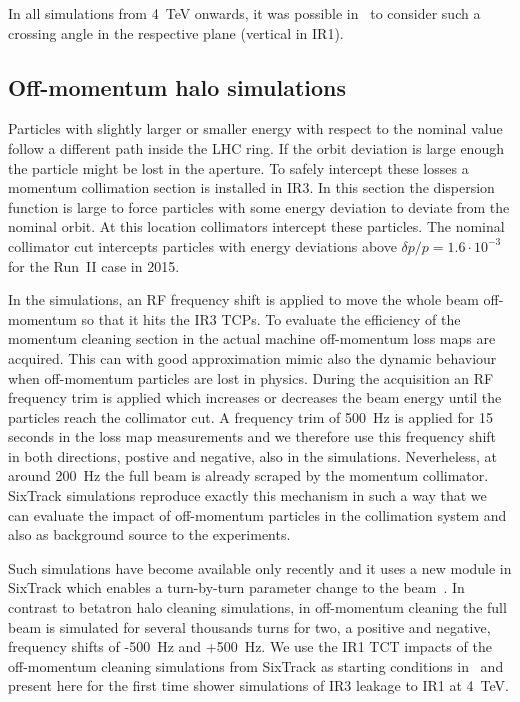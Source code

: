 In all simulations from 4~TeV onwards, it was possible in \fluka~to consider such a crossing angle in the respective plane (vertical in IR1).

\subsection{Off-momentum halo simulations}
Particles with slightly larger or smaller energy with respect to the nominal value follow a different path inside the LHC ring. If the orbit deviation is large enough the particle might be lost in the aperture. To safely intercept these losses a momentum collimation section is installed in IR3. In this section the dispersion function is large to force particles with some energy deviation to deviate from the nominal orbit. At this location collimators intercept these particles. The nominal collimator cut intercepts particles with energy deviations above $\delta p/p = 1.6\cdot 10^{-3}$ for the Run~II case in 2015.


In the simulations, an RF frequency shift is applied to move the whole beam off-momentum so that it hits the IR3 TCPs. To evaluate the efficiency of the momentum cleaning section in the actual machine off-momentum loss maps are acquired. This can with good approximation mimic also the dynamic behaviour when off-momentum particles are lost in physics. During the acquisition an RF frequency trim is applied which increases or decreases the beam energy until the particles reach the collimator cut. A frequency trim of 500~Hz is applied for 15 seconds in the loss map measurements and we therefore use this frequency shift in both directions, postive and negative, also in the simulations. Neverheless, at around 200~Hz the full beam is already scraped by the momentum collimator. SixTrack simulations reproduce exactly this mechanism in such a way that we can evaluate the impact of off-momentum particles in the collimation system and also as background source to the experiments.

Such simulations have become available only recently and it uses a new module in SixTrack which enables a turn-by-turn parameter change to the beam~\cite{KyrreIpac2015}. In contrast to betatron halo cleaning simulations, in off-momentum cleaning the full beam is simulated for several thousands turns for two, a positive and negative, frequency shifts of -500~Hz and +500~Hz. %
We use the IR1 TCT impacts of the off-momentum cleaning simulations from SixTrack as starting conditions in \fluka~and present here for the first time shower simulations of IR3 leakage to IR1 at 4~TeV. 


